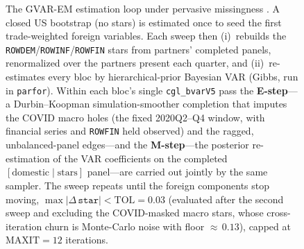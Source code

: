 \documentclass[11pt]{article}
\theoremstyle{definition}
\theoremstyle{remark}
\begin{document}
\begin{figure}[!ht]
\caption{The GVAR-EM estimation loop under pervasive missingness
\citep{GiannoneLenzaPrimiceri2019, DurbinKoopman2002}. A closed US
bootstrap (no stars) is estimated once to seed the first trade-weighted
foreign variables. Each sweep then (i)~rebuilds the
\texttt{ROWDEM}/\texttt{ROWINF}/\texttt{ROWFIN} stars from partners'
completed panels, renormalized over the partners present each quarter,
and (ii)~re-estimates every bloc by hierarchical-prior Bayesian VAR
(Gibbs, run in \texttt{parfor}). Within each bloc's single
\texttt{cgl\_bvarV5} pass the \textbf{E-step}---a Durbin--Koopman
simulation-smoother completion that imputes the COVID macro holes (the
fixed 2020Q2--Q4 window, with financial series and \texttt{ROWFIN} held
observed) and the ragged, unbalanced-panel edges---and the
\textbf{M-step}---the posterior re-estimation of the VAR coefficients on
the completed $[\text{domestic}\mid\text{stars}]$ panel---are carried out
jointly by the same sampler. The sweep repeats until the foreign
components stop moving, $\max|\Delta\,\texttt{star}| < \mathrm{TOL}=0.03$
(evaluated after the second sweep and excluding the COVID-masked macro
stars, whose cross-iteration churn is Monte-Carlo noise with floor
${\approx}\,0.13$), capped at $\mathrm{MAXIT}=12$ iterations.}
\label{fig:em-loop}
\end{figure}
\end{document}

